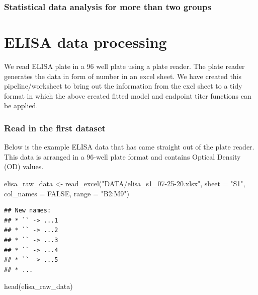 \documentclass[
]{book}
\newenvironment{Shaded}{\begin{snugshade}}{\end{snugshade}}
\newcommand{\AttributeTok}[1]{\textcolor[rgb]{0.77,0.63,0.00}{#1}}
\newcommand{\ConstantTok}[1]{\textcolor[rgb]{0.00,0.00,0.00}{#1}}
\newcommand{\FunctionTok}[1]{\textcolor[rgb]{0.00,0.00,0.00}{#1}}
\newcommand{\NormalTok}[1]{#1}
\newcommand{\OtherTok}[1]{\textcolor[rgb]{0.56,0.35,0.01}{#1}}
\newcommand{\StringTok}[1]{\textcolor[rgb]{0.31,0.60,0.02}{#1}}
\begin{document}
\hypertarget{statistical-data-analysis-for-more-than-two-groups}{%
\subsubsection{Statistical data analysis for more than two groups}\label{statistical-data-analysis-for-more-than-two-groups}}

\hypertarget{elisa-data-processing}{%
\section{ELISA data processing}\label{elisa-data-processing}}

We read ELISA plate in a 96 well plate using a plate reader. The plate reader generates the data in form of number in an excel sheet. We have created this pipeline/worksheet to bring out the information from the excl sheet to a tidy format in which the above created fitted model and endpoint titer functions can be applied.

\hypertarget{read-in-the-first-dataset}{%
\subsubsection{Read in the first dataset}\label{read-in-the-first-dataset}}

Below is the example ELISA data that has came straight out of the plate reader. This data is arranged in a 96-well plate format and contains Optical Density (OD) values.

\begin{Shaded}
\begin{Highlighting}[]
\NormalTok{elisa\_raw\_data }\OtherTok{\textless{}{-}} \FunctionTok{read\_excel}\NormalTok{(}\StringTok{"DATA/elisa\_s1\_07{-}25{-}20.xlsx"}\NormalTok{, }
                             \AttributeTok{sheet =} \StringTok{"S1"}\NormalTok{, }\AttributeTok{col\_names =} \ConstantTok{FALSE}\NormalTok{,  }
                             \AttributeTok{range =} \StringTok{"B2:M9"}\NormalTok{)}
\end{Highlighting}
\end{Shaded}

\begin{verbatim}
## New names:
## * `` -> ...1
## * `` -> ...2
## * `` -> ...3
## * `` -> ...4
## * `` -> ...5
## * ...
\end{verbatim}

\begin{Shaded}
\begin{Highlighting}[]
\FunctionTok{head}\NormalTok{(elisa\_raw\_data)}
\end{Highlighting}
\end{Shaded}
\end{document}
